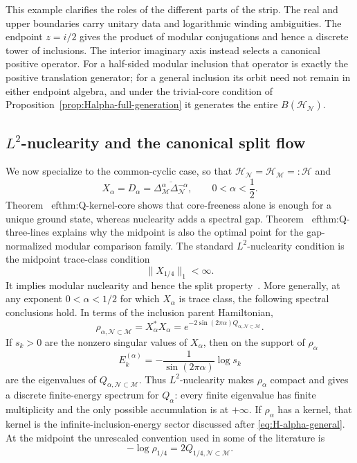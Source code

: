\documentclass[a4paper,11pt]{article}
\theoremstyle{definition}
\newcommand{\mN}{\mathcal{N}}
\newcommand{\mH}{\mathcal{H}}
\newcommand{\mM}{\mathcal{M}}
\begin{document}
This example clarifies the roles of the different parts of the strip. The
real and upper boundaries carry unitary data and logarithmic winding
ambiguities. The endpoint $z=i/2$ gives the product of modular conjugations
and hence a discrete tower of inclusions. The interior imaginary axis instead
selects a canonical positive operator. For a half-sided modular inclusion
that operator is exactly the positive translation generator; for a general
inclusion its orbit need not remain in either endpoint algebra, and under the
trivial-core condition of
Proposition~\ref{prop:Halpha-full-generation} it generates the entire
$B(\mH_{\mN})$.

\subsection{$L^2$-nuclearity and the canonical split flow}
\label{sec:nuclearity}

We now specialize to the common-cyclic case, so that
$\mH_{\mN}=\mH_{\mM}=: \mathcal H$ and
\begin{equation}
    X_\alpha=D_\alpha
    =\overline{\Delta_{\mM}^\alpha\Delta_{\mN}^{-\alpha}},
    \qquad 0<\alpha<\frac12 .
\end{equation}
Theorem~
ef{thm:Q-kernel-core} shows that core-freeness alone
is enough for a unique ground state, whereas nuclearity adds a spectral
gap. Theorem~
ef{thm:Q-three-lines} explains why the midpoint is
also the optimal point for the gap-normalized modular comparison family.
The standard $L^2$-nuclearity condition is the midpoint trace-class condition
\begin{equation}
    \boxed{\|X_{1/4}\|_1<\infty .}
    \label{eq:L2-nuclearity-alpha}
\end{equation}
It implies modular nuclearity and hence the split property~\cite{BDL2007}. More generally, at any exponent $0<\alpha<1/2$ for which $X_\alpha$ is trace class, the following spectral conclusions hold. In terms of the inclusion parent Hamiltonian,
\begin{equation}
    \rho_{\alpha,\mN\subset\mM}
    =X_\alpha^*X_\alpha
    =e^{-2\sin(2\pi\alpha)Q_{\alpha,\mN\subset\mM}}.
    \label{eq:rho-inclusion-vs-split}
\end{equation}
If $s_k>0$ are the nonzero singular values of $X_\alpha$, then on the support
of $\rho_\alpha$
\begin{equation}
    E_k^{(\alpha)}
    =-\frac{1}{\sin(2\pi\alpha)}\log s_k
\end{equation}
are the eigenvalues of $Q_{\alpha,\mN\subset\mM}$. Thus $L^2$-nuclearity makes
$\rho_\alpha$ compact and gives a discrete finite-energy spectrum for
$Q_\alpha$: every finite eigenvalue has finite multiplicity and the only
possible accumulation is at $+\infty$. If $\rho_\alpha$ has a kernel, that
kernel is the infinite-inclusion-energy sector discussed after
\eqref{eq:H-alpha-general}. At the midpoint the unrescaled convention used in
some of the literature is
\begin{equation}
    -\log\rho_{1/4}=2Q_{1/4,\mN\subset\mM}.
\end{equation}
\end{document}
